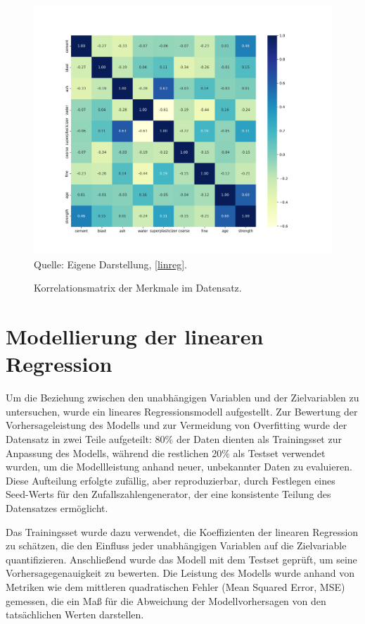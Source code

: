 \begin{figure}[!h]
    \caption{Korrelationsmatrix der Merkmale im Datensatz.}
    \includegraphics[width=1\textwidth]{../scripts/images/corr.png}
    Quelle: Eigene Darstellung, \ref{linreg}.
    \label{pic:corr}
\end{figure}

\section{Modellierung der linearen Regression}

Um die Beziehung zwischen den unabhängigen Variablen und der Zielvariablen  zu untersuchen, 
wurde ein lineares Regressionsmodell aufgestellt. 
Zur Bewertung der Vorhersageleistung des Modells und zur Vermeidung von Overfitting wurde der 
Datensatz in zwei Teile aufgeteilt: 80\% der Daten dienten als Trainingsset zur 
Anpassung des Modells, während die restlichen 20\% als Testset verwendet wurden, 
um die Modellleistung anhand neuer, unbekannter Daten zu evaluieren. 
Diese Aufteilung erfolgte zufällig, aber reproduzierbar, durch Festlegen eines Seed-Werts 
für den Zufallszahlengenerator, der eine konsistente Teilung des Datensatzes ermöglicht.

Das Trainingsset wurde dazu verwendet, die Koeffizienten der linearen Regression zu schätzen, 
die den Einfluss jeder unabhängigen Variablen auf die Zielvariable quantifizieren. 
Anschließend wurde das Modell mit dem Testset geprüft, um seine Vorhersagegenauigkeit zu bewerten. 
Die Leistung des Modells wurde anhand von Metriken wie dem mittleren quadratischen Fehler (Mean Squared Error, MSE) gemessen, 
die ein Maß für die Abweichung der Modellvorhersagen von den tatsächlichen Werten darstellen.

